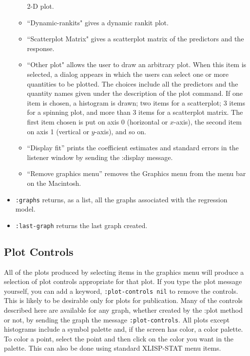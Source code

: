 \begin{itemize}
\begin{itemize}
2-D plot.
	\item ``Dynamic-rankits" gives a dynamic rankit plot.
	\item ``Scatterplot Matrix" gives a scatterplot matrix of the predictors and
the response.
   \item ``Other plot" allows the user to draw an arbitrary plot.  When this
item is selected, a dialog appears in which the users can select one or more
quantities to be plotted.  The choices include all the predictors and the
quantity names given under the description of the plot command.  If one item
is chosen, a histogram is drawn; two items for a scatterplot; 3 items for a
spinning plot, and more than 3 items for a scatterplot matrix.  The first item
chosen is put on axis 0 (horizontal or $x$-axis), the second item on axis 1
(vertical or $y$-axis), and so on.
	\item ``Display fit'' prints the coefficient estimates and standard errors
in the listener window by sending the :display message.
	\item ``Remove graphics menu'' removes the Graphics menu from the 
menu bar on the Macintosh.
	\end{itemize}
\item {\tt :graphs} returns, as a list, all the graphs associated with the
regression model.
\item {\tt :last-graph} returns the last graph created.  
\end{itemize}

\subsection{Plot Controls}
All of the plots produced by selecting items in the graphics menu will produce
a selection of plot controls appropriate for that plot.  If you type the plot
message yourself, you can add a keyword, {\tt :plot-controls nil} to remove
the controls.  This is likely to be desirable only for plots for publication.
Many of the controls described here are available for any graph, whether
created by the :plot method or not, by sending the graph the message 
{\tt :plot-controls}.  All plots except histograms include a symbol palette
and, if the screen has color, a color palette.  To color a point, select the
point and then click on the color you want in the palette.  This can also be
done using standard XLISP-STAT menu items.
